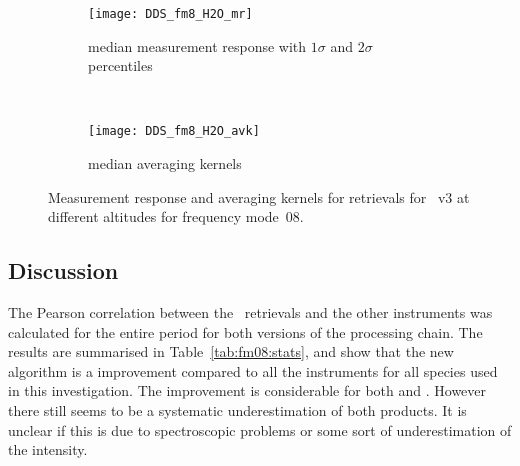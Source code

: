 \begin{figure}[htpb]
    \centering
    \begin{subfigure}[b]{0.49\textwidth}
        \texttt{[image: DDS\_fm8\_H2O\_mr]}
        \caption{median measurement response with $1\sigma$ and $2\sigma$
        percentiles}
        \label{fig:fm08:H2O:mr}
    \end{subfigure}
    \,
    \begin{subfigure}[b]{0.49\textwidth}
        \texttt{[image: DDS\_fm8\_H2O\_avk]}
        \caption{median averaging kernels\newline~}
        \label{fig:fm08:H2O:avk}
    \end{subfigure}
    \caption{Measurement response and averaging kernels for 
    retrievals for \smr~v3 at different altitudes for frequency mode~08.}
    \label{fig:fm08:H2O:mr_avk}
\end{figure}


\subsection{Discussion}
\label{sec:fm08:discussion}
The Pearson correlation between the \smr\ retrievals and the other instruments
was calculated for the entire period for both versions of the processing chain.
The results are summarised in Table~\ref{tab:fm08:stats}, and show that the
new algorithm is a improvement compared to all the instruments for all species
used in this investigation. The improvement is considerable for both 
and .  However there still seems to be a systematic underestimation of both products.  
It is unclear if this is due to spectroscopic problems or some sort of underestimation of the intensity.



